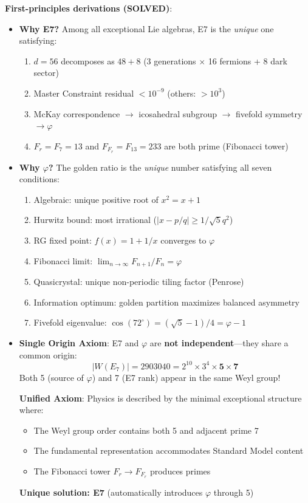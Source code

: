 \documentclass[11pt,a4paper]{article}
\begin{document}
\textbf{First-principles derivations (SOLVED)}:
\begin{itemize}
\item \textbf{Why E7?} Among all exceptional Lie algebras, E7 is the \textit{unique} one satisfying:
  \begin{enumerate}
  \item $d = 56$ decomposes as $48 + 8$ (3 generations $\times$ 16 fermions + 8 dark sector)
  \item Master Constraint residual $< 10^{-9}$ (others: $> 10^3$)
  \item McKay correspondence $\to$ icosahedral subgroup $\to$ fivefold symmetry $\to \varphi$
  \item $F_r = F_7 = 13$ and $F_{F_r} = F_{13} = 233$ are both prime (Fibonacci tower)
  \end{enumerate}

\item \textbf{Why $\varphi$?} The golden ratio is the \textit{unique} number satisfying all seven conditions:
  \begin{enumerate}
  \item Algebraic: unique positive root of $x^2 = x + 1$
  \item Hurwitz bound: most irrational ($|x - p/q| \geq 1/\sqrt{5}q^2$)
  \item RG fixed point: $f(x) = 1 + 1/x$ converges to $\varphi$
  \item Fibonacci limit: $\lim_{n\to\infty} F_{n+1}/F_n = \varphi$
  \item Quasicrystal: unique non-periodic tiling factor (Penrose)
  \item Information optimum: golden partition maximizes balanced asymmetry
  \item Fivefold eigenvalue: $\cos(72^\circ) = (\sqrt{5}-1)/4 = \varphi - 1$
  \end{enumerate}

\item \textbf{Single Origin Axiom}: E7 and $\varphi$ are \textbf{not independent}---they share a common origin:
  \begin{equation}
  |W(E_7)| = 2903040 = 2^{10} \times 3^4 \times \mathbf{5} \times \mathbf{7}
  \end{equation}
  Both 5 (source of $\varphi$) and 7 (E7 rank) appear in the same Weyl group!
  
  \textbf{Unified Axiom}: Physics is described by the minimal exceptional structure where:
  \begin{itemize}
  \item The Weyl group order contains both 5 and adjacent prime 7
  \item The fundamental representation accommodates Standard Model content
  \item The Fibonacci tower $F_r \to F_{F_r}$ produces primes
  \end{itemize}
  \textbf{Unique solution: E7} (automatically introduces $\varphi$ through 5)
\end{itemize}
\end{document}
